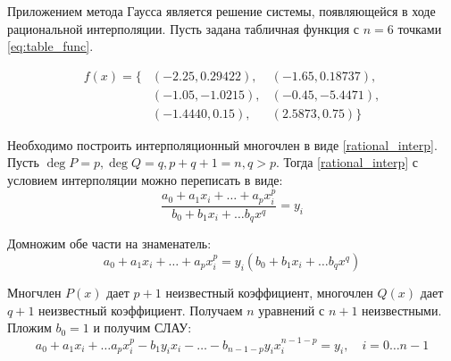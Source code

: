 \documentclass[a4paper, fontsize=14pt]{article}
\begin{document}
Приложением метода Гаусса является решение системы, появляющейся в ходе рациональной интерполяции. Пусть задана табличная функция с $n = 6$ точками \eqref{eq:table_func}.

\begin{equation}
    \label{eq:table_func}
    \begin{aligned}
        f(x) = \{ & (-2.25,0.29422),  & (-1.65, 0.18737), \\
                  & (-1.05, -1.0215), & (-0.45,-5.4471),  \\
                  & (-1.4440,0.15),   & (2.5873, 0.75)\}
    \end{aligned}
\end{equation}

Необходимо построить интерполяционный многочлен в виде \eqref{rational_interp}.
Пусть $\operatorname{deg} P = p, \operatorname{deg} Q = q, p + q + 1= n, q > p$. Тогда \eqref{rational_interp} с условием интерполяции можно переписать в виде:
\begin{equation*}
    \frac{a_0 + a_1 x_i + \dots + a_p x_i^p}{b_0 + b_1 x_i + \dots b_q x^q} = y_i
\end{equation*}

Домножим обе части на знаменатель:
\begin{equation*}
    a_0 + a_1 x_i + \dots + a_p x_i^p = y_i (b_0 + b_1 x_i + \dots b_q x^q)
\end{equation*}

Многчлен $P(x)$ дает $p+1$ неизвестный коэффициент, многочлен $Q(x)$ дает $q + 1$ неизвестный коэффициент. Получаем $n$ уравнений с  $n+1$ неизвестными.
Пложим $b_0 = 1$ и получим СЛАУ:
\begin{equation*}
    a_0 + a_1 x_i + \dots a_{p} x_i^p - b_1 y_i x_i - \dots - b_{n-   1-p} y_i x_i^{n-1-p} = y_i, \quad i = 0 \dots n - 1
\end{equation*}
\end{document}
